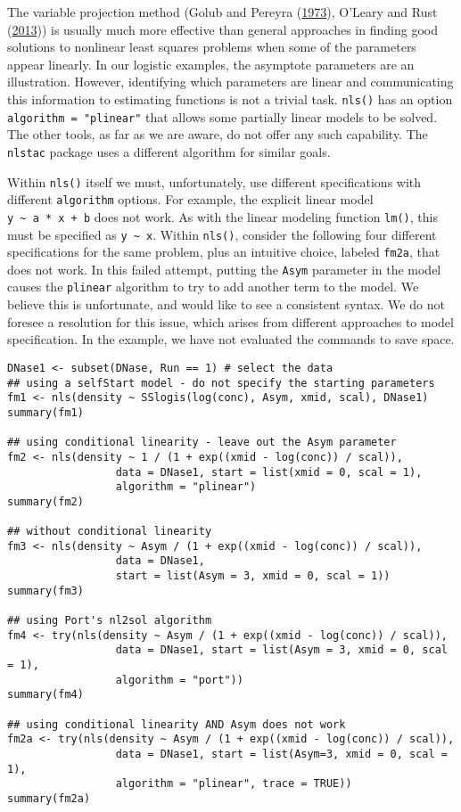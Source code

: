 The variable projection method (Golub and Pereyra (\protect\hyperlink{ref-Golub1973}{1973}), O'Leary and Rust (\protect\hyperlink{ref-OlearyRust13}{2013})) is
usually much more effective than general approaches in finding good solutions
to nonlinear least squares
problems when some of the parameters appear linearly. In our logistic examples,
the asymptote parameters are an illustration. However, identifying which parameters
are linear and communicating this information to estimating functions
is not a trivial task. \texttt{nls()} has an option \texttt{algorithm\ =\ "plinear"} that allows some partially linear
models to be solved. The other tools, as far as we are aware, do not offer any
such capability. The \texttt{nlstac} package uses a different algorithm for similar goals.

Within \texttt{nls()} itself we must, unfortunately, use
different specifications with different \texttt{algorithm} options.
For example, the explicit linear model \texttt{y\ \textasciitilde{}\ a\ *\ x\ +\ b} does not work. As with
the linear modeling function \texttt{lm()}, this must be specified as \texttt{y\ \textasciitilde{}\ x}.
Within \texttt{nls()}, consider the following four different specifications for the same
problem, plus an intuitive choice, labeled \texttt{fm2a}, that does not work.
In this failed attempt, putting the \texttt{Asym} parameter in the model causes the
\texttt{plinear} algorithm
to try to add another term to the model. We believe this is unfortunate, and would
like to see a consistent syntax. We do not foresee a resolution for this issue, which
arises from different approaches to model specification. In the example, we have not evaluated
the commands to save space.

\begin{verbatim}
DNase1 <- subset(DNase, Run == 1) # select the data
## using a selfStart model - do not specify the starting parameters
fm1 <- nls(density ~ SSlogis(log(conc), Asym, xmid, scal), DNase1)
summary(fm1)

## using conditional linearity - leave out the Asym parameter
fm2 <- nls(density ~ 1 / (1 + exp((xmid - log(conc)) / scal)),
                 data = DNase1, start = list(xmid = 0, scal = 1),
                 algorithm = "plinear")
summary(fm2)

## without conditional linearity
fm3 <- nls(density ~ Asym / (1 + exp((xmid - log(conc)) / scal)),
                 data = DNase1,
                 start = list(Asym = 3, xmid = 0, scal = 1))
summary(fm3)

## using Port's nl2sol algorithm
fm4 <- try(nls(density ~ Asym / (1 + exp((xmid - log(conc)) / scal)),
                 data = DNase1, start = list(Asym = 3, xmid = 0, scal = 1),
                 algorithm = "port"))
summary(fm4)

## using conditional linearity AND Asym does not work
fm2a <- try(nls(density ~ Asym / (1 + exp((xmid - log(conc)) / scal)), 
                 data = DNase1, start = list(Asym=3, xmid = 0, scal = 1),
                 algorithm = "plinear", trace = TRUE))
summary(fm2a)
\end{verbatim}

